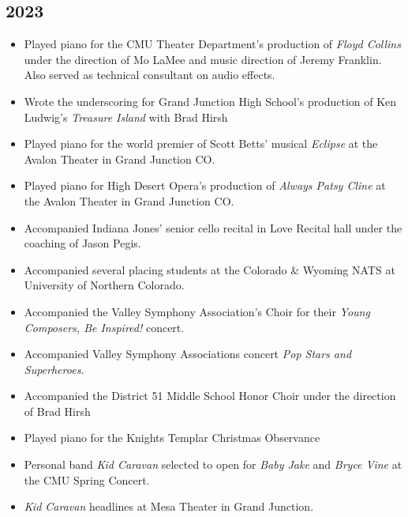 \documentclass{article}
\newcommand{\cvItem}[1]{
        \item {
            {#1}
        }
    }
\newcommand{\cvItemListStart}{\begin{itemize}[leftmargin=10pt]}
\newcommand{\cvItemListEnd}{\end{itemize}}
\begin{document}
        \subsection{2023}
            \cvItemListStart
                \cvItem{Played piano for the CMU Theater Department's production of {\em Floyd
                Collins} under the direction of Mo LaMee and music direction of Jeremy Franklin.
                Also served as technical consultant on audio effects.}
                \cvItem{Wrote the underscoring for Grand Junction High School's production of Ken
                Ludwig's {\em Treasure Island} with Brad Hirsh}
                \cvItem{Played piano for the world premier of Scott Betts' musical {\em Eclipse} at
                the Avalon Theater in Grand Junction CO.}
                \cvItem{Played piano for High Desert Opera's production of {\em Always Patsy Cline}
                at the Avalon Theater in Grand Junction CO.}
                \cvItem{Accompanied Indiana Jones' senior cello recital in Love Recital hall under
                the coaching of Jason Pegis.}
                \cvItem{Accompanied several placing students at the Colorado \& Wyoming NATS at
                University of Northern Colorado.}
                \cvItem{Accompanied the Valley Symphony Association's Choir for their {\em Young
                Composers, Be Inspired!} concert.}
                \cvItem{Accompanied Valley Symphony Associations concert {\em Pop Stars and
                Superheroes.}}
                \cvItem{Accompanied the District 51 Middle School Honor Choir under the direction of
                Brad Hirsh}
                \cvItem{Played piano for the Knights Templar Christmas Observance}
                \cvItem{Personal band {\em Kid Caravan} selected to open for {\em Baby Jake} and
                {\em Bryce Vine} at the CMU Spring Concert.}
                \cvItem{{\em Kid Caravan} headlines at Mesa Theater in Grand Junction.}
            \cvItemListEnd
\end{document}
